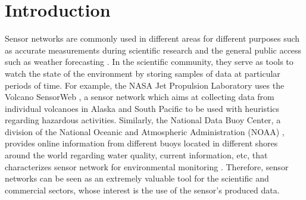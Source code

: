



\chapter{Introduction}

Sensor networks are commonly used in different areas for different purposes
such as accurate measurements during scientific research \cite{sn-intro01} and
the general public access such as weather forecasting \cite{sn-intro02}. In the
scientific community, they serve as tools to watch the state of the environment
by storing samples of data at particular periods of time. For example, the
NASA Jet Propulsion Laboratory uses the Volcano SensorWeb \cite{sn-ex02}, a
sensor network which aims at collecting data from individual volcanoes in
Alaska and South Pacific to be used with heuristics regarding hazardous
activities. Similarly, the National Data Buoy Center, a division of the
National Oceanic and Atmospheric Administration (NOAA) \cite{sn-ex03},
provides online information from different buoys located in different shores around
the world regarding water quality, current information, etc, that
characterizes sensor network for environmental monitoring \cite{sn-ex01}.
Therefore, sensor networks can be seen as an extremely valuable tool
for the scientific and commercial sectors, whose interest is the use of
the sensor's produced data.

